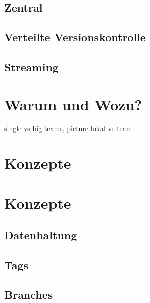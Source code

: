 \subsection{Zentral}
\subsection{Verteilte Versionskontrolle}
\subsection{Streaming}
\section{Warum und Wozu?}
single vs big teams, picture lokal vs team
\label{sec:why}
\section{Konzepte}
\label{sec:systems}
\section{Konzepte}
\label{sec:Konzepte}
\subsection{Datenhaltung}
\label{sec:Datenhaltung}
\subsection{Tags}
\label{sec:Tags}
\subsection{Branches}
\label{sec:Branches}
